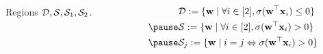\documentclass[handout,usenames,dvipsnames]{beamer} %
\newcommand{\bx}{\mathbf{x}}
\newcommand{\bw}{\mathbf{w}}
\newcommand{\cd}{{\cal D}}
\newcommand{\cs}{{\cal S}}
\begin{document}
\begin{frame}
    \begin{columns}
            \begin{column}{0.5\textwidth}
                \begin{figure}[t]
                    \centering
                    \caption{Regions $\cd, \cs, \cs_1, \cs_2$.}
                    \label{fig:D_and_Ss_regions}
                \end{figure}
            \end{column}
            \pause
            
            \begin{column}{0.7\textwidth}
                {\fontsize{10}{10} \selectfont
                \begin{eqnarray*}
                    &\mathcal{D} := \{ \bw \mid \forall i \in [2], \sigma(\bw^\top \bx_i) \le 0\}\\
                    \pause
                    &\mathcal{S} := \{ \bw \mid \forall i \in [2], \sigma(\bw^\top \bx_i) > 0 \}\\
                    \pause
                    &\mathcal{S}_j := \{ \bw  \mid  i=j \Leftrightarrow \sigma(\bw^\top \bx_i) > 0 \}
                \end{eqnarray*}
                }
            \end{column}
    \end{columns}
    

\end{frame}
\end{document}
